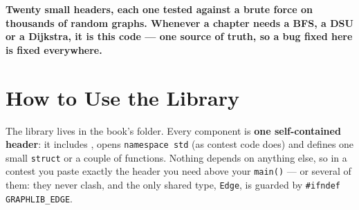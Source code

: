 \begin{tcolorbox}[enhanced, colback=white, colframe=secondaryblue, boxrule=1pt, arc=2mm, left=10pt, right=10pt]
\textbf{\large\textcolor{primaryblue}{Twenty small headers, each one tested against a brute force on thousands of random graphs. Whenever a chapter needs a BFS, a DSU or a Dijkstra, it is this code --- one source of truth, so a bug fixed here is fixed everywhere.}}
\end{tcolorbox}

\chaptercontents

\clneed
\section{How to Use the Library}
\label{sec:cl-howto}

The library lives in the book's  folder. Every component is \textbf{one self-contained header}: it includes , opens \texttt{namespace std} (as contest code does) and defines one small \texttt{struct} or a couple of functions. Nothing depends on anything else, so in a contest you paste exactly the header you need above your \texttt{main()} --- or several of them: they never clash, and the only shared type, \texttt{Edge}, is guarded by \texttt{\#ifndef GRAPHLIB\_EDGE}.

